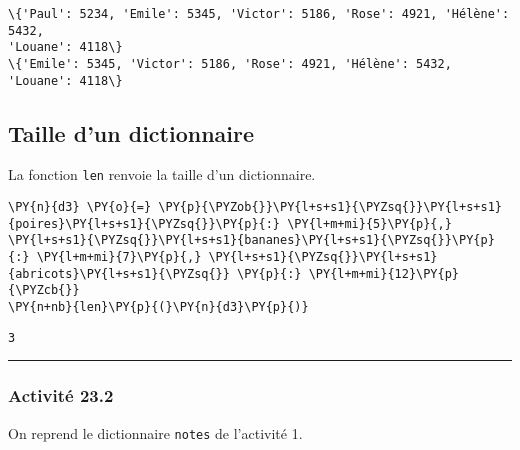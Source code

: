 \documentclass[12pt]{book}
\begin{document}
    \begin{Verbatim}[commandchars=\\\{\}]
\{'Paul': 5234, 'Emile': 5345, 'Victor': 5186, 'Rose': 4921, 'Hélène': 5432,
'Louane': 4118\}
\{'Emile': 5345, 'Victor': 5186, 'Rose': 4921, 'Hélène': 5432, 'Louane': 4118\}
    \end{Verbatim}

    \hypertarget{taille-dun-dictionnaire}{%
\subsection{Taille d'un dictionnaire}\label{taille-dun-dictionnaire}}

La fonction \texttt{len} renvoie la taille d'un dictionnaire.

    \begin{tcolorbox}[breakable, size=fbox, boxrule=1pt, pad at break*=1mm,colback=cellbackground, colframe=cellborder]
\begin{Verbatim}[commandchars=\\\{\}]
\PY{n}{d3} \PY{o}{=} \PY{p}{\PYZob{}}\PY{l+s+s1}{\PYZsq{}}\PY{l+s+s1}{poires}\PY{l+s+s1}{\PYZsq{}}\PY{p}{:} \PY{l+m+mi}{5}\PY{p}{,} \PY{l+s+s1}{\PYZsq{}}\PY{l+s+s1}{bananes}\PY{l+s+s1}{\PYZsq{}}\PY{p}{:} \PY{l+m+mi}{7}\PY{p}{,} \PY{l+s+s1}{\PYZsq{}}\PY{l+s+s1}{abricots}\PY{l+s+s1}{\PYZsq{}} \PY{p}{:} \PY{l+m+mi}{12}\PY{p}{\PYZcb{}}
\PY{n+nb}{len}\PY{p}{(}\PY{n}{d3}\PY{p}{)}
\end{Verbatim}
\end{tcolorbox}

            \begin{tcolorbox}[breakable, size=fbox, boxrule=.5pt, pad at break*=1mm, opacityfill=0]
\begin{Verbatim}[commandchars=\\\{\}]
3
\end{Verbatim}
\end{tcolorbox}
        
    \begin{center}\rule{0.5\linewidth}{0.5pt}\end{center}

\hypertarget{activituxe9-23.2}{%
\subsubsection{Activité 23.2}\label{activituxe9-23.2}}

On reprend le dictionnaire \texttt{notes} de l'activité 1.
\end{document}
